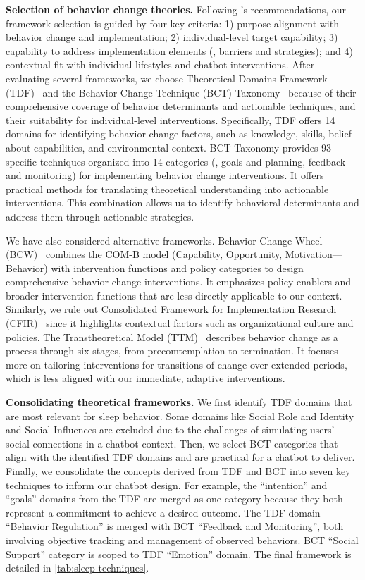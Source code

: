\textbf{Selection of behavior change theories.}
Following \citet{moullin2020ten}'s recommendations, our framework selection is guided by four key criteria:
1) purpose alignment with behavior change and implementation;
2) individual-level target capability;
3) capability to address implementation elements (\eg, barriers and strategies);
and 4) contextual fit with individual lifestyles and chatbot interventions.
After evaluating several frameworks, 
we choose Theoretical Domains Framework (TDF)~\cite{atkins2017guide} and the Behavior Change Technique (BCT) Taxonomy~\cite{michie2013behavior} because of their comprehensive coverage of behavior determinants and actionable techniques, and their suitability for individual-level interventions.
Specifically,
TDF offers 14 domains for identifying behavior change factors,
such as knowledge, skills, belief about capabilities, and environmental context.
BCT Taxonomy provides 93 specific techniques organized into 14 categories (\eg, goals and planning, feedback and monitoring) for implementing behavior change interventions.
It offers practical methods for translating theoretical understanding into actionable interventions.
This combination allows us to identify behavioral determinants and address them through actionable strategies.

We have also considered alternative frameworks. 
Behavior Change Wheel (BCW)~\cite{michie2011behaviour} combines the COM-B model (Capability, Opportunity, Motivation—Behavior) with intervention functions and policy categories to design comprehensive behavior change interventions.
It emphasizes policy enablers and broader intervention functions that are less directly applicable to our context.
Similarly, we rule out Consolidated Framework for Implementation Research (CFIR)~\cite{damschroder2009fostering} since it highlights contextual factors such as organizational culture and policies.
The Transtheoretical Model (TTM)~\cite{prochaska1997transtheoretical} describes behavior change as a process through six stages, from precomtemplation to termination.
It focuses more on tailoring interventions for transitions of change over extended periods, which is less aligned with our immediate, adaptive interventions.

\textbf{Consolidating theoretical frameworks.}
We first identify TDF domains that are most relevant for sleep behavior.
Some domains like Social Role and Identity and Social Influences are excluded due to the challenges of simulating users' social connections in a chatbot context.
Then, we select BCT categories that align with the identified TDF domains and are practical for a chatbot to deliver.
Finally, we consolidate the concepts derived from TDF and BCT into seven key techniques to inform our chatbot design. 
For example, the ``intention'' and ``goals''
domains from the TDF are merged as one category because they both represent a commitment to achieve a desired outcome. 
The TDF domain ``Behavior Regulation'' is merged with BCT ``Feedback and Monitoring'', both involving objective tracking and management of observed behaviors.
BCT ``Social Support'' category is scoped to TDF ``Emotion'' domain.
The final framework is detailed in \autoref{tab:sleep-techniques}.

